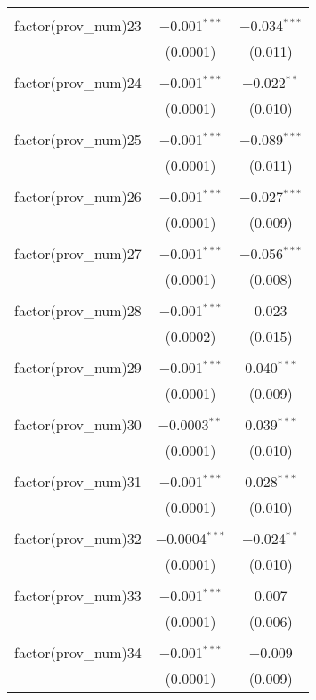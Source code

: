 \begin{table}[ht!]
\begin{tabular}{@{\extracolsep{5pt}}lcc}
  & & \\ 
 factor(prov\_num)23 & $-$0.001$^{***}$ & $-$0.034$^{***}$ \\ 
  & (0.0001) & (0.011) \\ 
  & & \\ 
 factor(prov\_num)24 & $-$0.001$^{***}$ & $-$0.022$^{**}$ \\ 
  & (0.0001) & (0.010) \\ 
  & & \\ 
 factor(prov\_num)25 & $-$0.001$^{***}$ & $-$0.089$^{***}$ \\ 
  & (0.0001) & (0.011) \\ 
  & & \\ 
 factor(prov\_num)26 & $-$0.001$^{***}$ & $-$0.027$^{***}$ \\ 
  & (0.0001) & (0.009) \\ 
  & & \\ 
 factor(prov\_num)27 & $-$0.001$^{***}$ & $-$0.056$^{***}$ \\ 
  & (0.0001) & (0.008) \\ 
  & & \\ 
 factor(prov\_num)28 & $-$0.001$^{***}$ & 0.023 \\ 
  & (0.0002) & (0.015) \\ 
  & & \\ 
 factor(prov\_num)29 & $-$0.001$^{***}$ & 0.040$^{***}$ \\ 
  & (0.0001) & (0.009) \\ 
  & & \\ 
 factor(prov\_num)30 & $-$0.0003$^{**}$ & 0.039$^{***}$ \\ 
  & (0.0001) & (0.010) \\ 
  & & \\ 
 factor(prov\_num)31 & $-$0.001$^{***}$ & 0.028$^{***}$ \\ 
  & (0.0001) & (0.010) \\ 
  & & \\ 
 factor(prov\_num)32 & $-$0.0004$^{***}$ & $-$0.024$^{**}$ \\ 
  & (0.0001) & (0.010) \\ 
  & & \\ 
 factor(prov\_num)33 & $-$0.001$^{***}$ & 0.007 \\ 
  & (0.0001) & (0.006) \\ 
  & & \\ 
 factor(prov\_num)34 & $-$0.001$^{***}$ & $-$0.009 \\ 
  & (0.0001) & (0.009) \\ 

\end{tabular}
\end{table}
